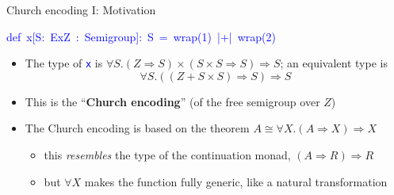 \documentclass[english,,russian]{beamer}
\newenvironment{lyxcode}
  {\par\begin{list}{}{
    \setlength{\rightmargin}{\leftmargin}
    \setlength{\listparindent}{0pt}%
    \raggedright
    \setlength{\itemsep}{0pt}
    \setlength{\parsep}{0pt}
    \normalfont\ttfamily}%
   \def\{{\char`\{}
   \def\}{\char`\}}
   \def\textasciitilde{\char`\~}
   \item[]}
  {\end{list}}
\begin{document}
\begin{frame}{Church encoding I: Motivation}
\begin{lyxcode}
\textcolor{blue}{\footnotesize{}def~x{[}S:~ExZ~:~Semigroup{]}:~S~=~wrap(1)~|+|~wrap(2)}{\footnotesize\par}
\end{lyxcode}
\begin{itemize}
\item The type of \texttt{\textcolor{blue}{\footnotesize{}x}} is {\footnotesize{}$\forall S.\left(Z\Rightarrow S\right)\times\left(S\times S\Rightarrow S\right)\Rightarrow S$};
an equivalent type is{\footnotesize{}
\[
\forall S.\left(\left(Z+S\times S\right)\Rightarrow S\right)\Rightarrow S
\]
}{\footnotesize\par}
\item {\footnotesize{}\vspace{-0.1cm}}This is the ``\textbf{Church encoding}''
(of the free semigroup over $Z$)
\item The Church encoding is based on the theorem {\footnotesize{}$A\cong\forall X.\left(A\Rightarrow X\right)\Rightarrow X$} 
\begin{itemize}
\item this \emph{resembles} the type of the continuation monad, $\left(A\Rightarrow R\right)\Rightarrow R$ 
\item but $\forall X$ makes the function fully generic, like a natural
transformation
\end{itemize}
\end{itemize}
\end{frame}
\end{document}
